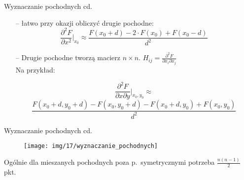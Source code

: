   \begin{frame}{Wyznaczanie pochodnych cd.}

    \begin{block}{}
      \begin{itemize}
 	      \item[--] łatwo przy okazji obliczyć drugie pochodne:
 	  	  \begin{displaymath}
 	   	  	\frac{\partial^2 F}{\partial x^2} \bigg\vert_{x_0} \approx \frac{F(x_0+d) - 2 \cdot F(x_0) + F(x_0-d)}{d^2}
 	      \end{displaymath}
 	     
 	      \item[--] Drugie pochodne tworzą macierz $n \times n$.
 	       $H_{ij} = \left. \frac{\partial^2 F}{\partial x_i \partial x_j}$\\
 	       Na przykład:
 	       \begin{small}
 	       $$
 	       \frac{\partial^2 F}{\partial x \partial y}\bigg\vert_{x_0, y_0}\approx$$
 	       $$
 	       \frac{F(x_0+d, y_0+d) -F(x_0, y_0+d) - F(x_0+d, y_0)+F(x_0,y_0)}{d^2}
 	       $$
 	       \end{small}
      \end{itemize}
  	\end{block}
  \end{frame}

  \begin{frame}{Wyznaczanie pochodnych cd.}
    \begin{figure}
		\centering
		\texttt{[image: img/17/wyznaczanie\_pochodnych]}
	\end{figure}
    \begin{block}{}
     Ogólnie dla mieszanych pochodnych poza p.~symetrycznymi potrzeba $\frac{n(n-1)}{2}$ pkt. 
  	\end{block}

  \end{frame}

